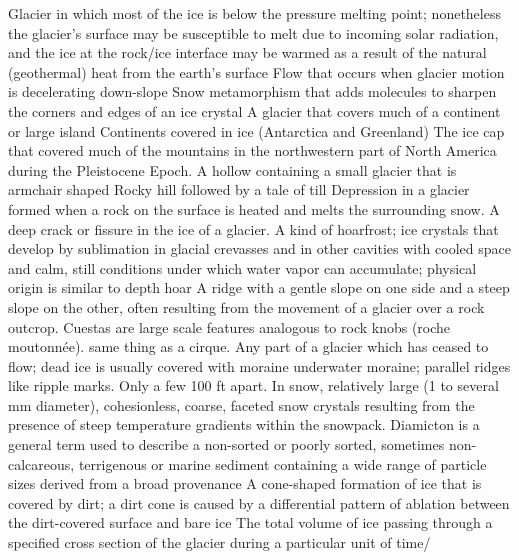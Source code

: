  Glacier in which most of the ice is below the pressure melting point; nonetheless the glacier's surface may be susceptible to melt due to incoming solar radiation, and the ice at the rock/ice interface may be warmed as a result of the natural (geothermal) heat from the earth's surface
 Flow that occurs when glacier motion is decelerating down-slope
 Snow metamorphism that adds molecules to sharpen the corners and edges of an ice crystal
 A glacier that covers much of a continent or large island
 Continents covered in ice (Antarctica and Greenland)
 The ice cap that covered much of the mountains in the northwestern part of North America during the Pleistocene Epoch.
 A hollow containing a small glacier that is armchair shaped
 Rocky hill followed by a tale of till
 Depression in a glacier formed when a rock on the surface is heated and melts the surrounding snow.
 A deep crack or fissure in the ice of a glacier.
 A kind of hoarfrost; ice crystals that develop by sublimation in glacial crevasses and in other cavities with cooled space and calm, still conditions under which water vapor can accumulate; physical origin is similar to depth hoar
 A ridge with a gentle slope on one side and a steep slope on the other, often resulting from the movement of a glacier over a rock outcrop. Cuestas are large scale features analogous to rock knobs (roche moutonnée).
 same thing as a cirque.
 Any part of a glacier which has ceased to flow; dead ice is usually covered with moraine
 underwater moraine; parallel ridges like ripple marks. Only a few 100 ft apart.
 In snow, relatively large (1 to several mm diameter), cohesionless, coarse, faceted snow crystals resulting from the presence of steep temperature gradients within the snowpack.
 Diamicton is a general term used to describe a non-sorted or poorly sorted, sometimes non-calcareous, terrigenous or marine sediment containing a wide range of particle sizes derived from a broad provenance
 A cone-shaped formation of ice that is covered by dirt; a dirt cone is caused by a differential pattern of ablation between the dirt-covered surface and bare ice
 The total volume of ice passing through a specified cross section of the glacier during a particular unit of time/
